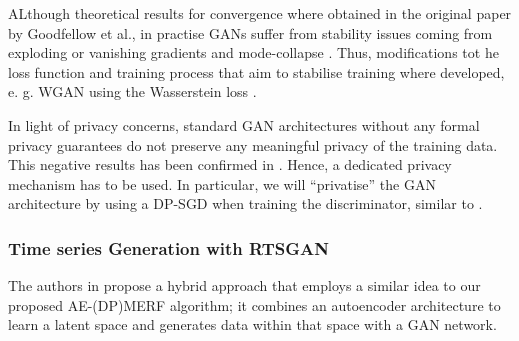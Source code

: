 ALthough theoretical results for convergence where obtained in the original paper by Goodfellow et al., in practise GANs suffer from stability issues coming from exploding or vanishing gradients and mode-collapse \parencite[see][for in-depth review]{gui2020review,jabbar2020survey}. Thus, modifications tot he loss function and training process that aim to stabilise training where developed, e. g. WGAN using the Wasserstein loss \parencite{arjovsky2017wasserstein}.

In light of privacy concerns, standard GAN architectures without any formal privacy guarantees do not preserve any meaningful privacy of the training data. This negative results has been confirmed in \parencite{lin2021privacy,stadler2022synthetic}. Hence, a dedicated privacy mechanism has to be used. In particular, we will ``privatise'' the GAN architecture by using a DP-SGD when training the discriminator, similar to \parencite{xie2018differentially}.

\subsubsection{Time series Generation with RTSGAN}
The authors in \parencite{pei2021towards} propose a hybrid approach that employs a similar idea to our proposed AE-(DP)MERF algorithm; it combines an autoencoder architecture to learn a latent space and generates data within that space with a GAN network.